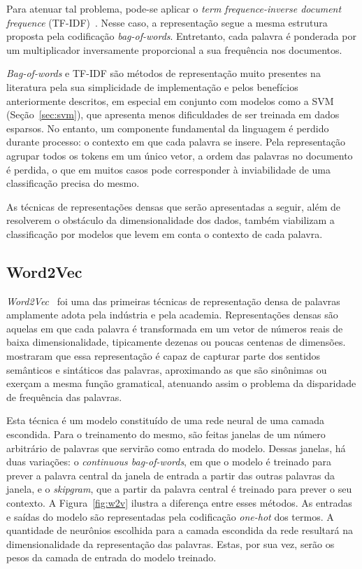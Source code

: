 Para atenuar tal problema, pode-se aplicar o \textit{term frequence-inverse
document frequence} (TF-IDF)~\cite{salton88}.
Nesse caso, a representação segue a mesma estrutura proposta pela codificação
\textit{bag-of-words}.
Entretanto, cada palavra é ponderada por um multiplicador inversamente
proporcional a sua frequência nos documentos.


\textit{Bag-of-words} e TF-IDF são métodos de representação muito presentes na
literatura pela sua simplicidade de implementação e pelos benefícios
anteriormente descritos, em especial em conjunto com modelos como a
SVM (Seção~\ref{sec:svm}), que apresenta menos dificuldades de ser treinada em
dados esparsos.
No entanto, um componente fundamental da linguagem é perdido durante processo: o
contexto em que cada palavra se insere.
Pela representação agrupar todos os tokens em um único vetor, a ordem das
palavras no documento é perdida, o que em muitos casos pode corresponder à
inviabilidade de uma classificação precisa do mesmo.


As técnicas de representações densas que serão apresentadas a seguir, além de
resolverem o obstáculo da dimensionalidade dos dados, também viabilizam a
classificação por modelos que levem em conta o contexto de cada palavra.

\subsection{Word2Vec} \label{sec:w2v}

\textit{Word2Vec}~\cite{mikolov13} foi uma das primeiras técnicas de
representação densa de palavras amplamente adota pela indústria e pela academia.
Representações densas são aquelas em que cada palavra é transformada em um vetor
de números reais de baixa dimensionalidade, tipicamente dezenas ou poucas
centenas de dimensões.
\citet{mikolov13} mostraram que essa representação é capaz de capturar parte dos
sentidos semânticos e sintáticos das palavras, aproximando as que são sinônimas
ou exerçam a mesma função gramatical, atenuando assim o problema da disparidade
de frequência das palavras.

Esta técnica é um modelo constituído de uma rede neural de uma camada escondida.
Para o treinamento do mesmo, são feitas janelas de um número arbitrário de
palavras que servirão como entrada do modelo.
Dessas janelas, há duas variações: o \textit{continuous bag-of-words}, em que
o modelo é treinado para prever a palavra central da janela de entrada a partir
das outras palavras da janela, e o \textit{skipgram}, que a partir da palavra
central é treinado para prever o seu contexto.
A Figura~\ref{fig:w2v} ilustra a diferença entre esses métodos.
As entradas e saídas do modelo são representadas pela codificação
\textit{one-hot} dos termos.
A quantidade de neurônios escolhida para a camada escondida da rede resultará na
dimensionalidade da representação das palavras.
Estas, por sua vez, serão os pesos da camada de entrada do modelo treinado.

